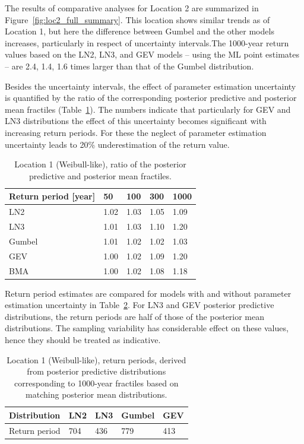 The results of comparative analyses for Location 2 are summarized in Figure~\ref{fig:loc2_full_summary}. This location shows similar trends as of Location 1, but here the difference between Gumbel and the other models increases, particularly in respect of uncertainty intervals.The 1000-year return values based on the LN2, LN3, and GEV models -- using the ML point estimates -- are 2.4, 1.4, 1.6 times larger than that of the Gumbel distribution. %

Besides the uncertainty intervals, the effect of parameter estimation uncertainty is quantified by the ratio of the corresponding posterior predictive and posterior mean fractiles (Table~\ref{tab:loc1_fract_ratio}). The numbers indicate that particularly for GEV and LN3 distributions the effect of this uncertainty becomes significant with increasing return periods. For these the neglect of parameter estimation uncertainty leads to 20\% underestimation of the return value.

\begin{table}[htbp!]
\caption{Location 1 (Weibull-like), ratio of the posterior predictive and posterior mean fractiles.}
\centering
\label{tab:loc1_fract_ratio}
\small
    \begin{tabular}{lllll}
    \toprule
    Return period [year]  & 50 & 100 & 300 & 1000 \\
    \midrule
    \rowcolor{lightgrey} LN2 & 1.02 & 1.03 & 1.05 &	1.09  \\
    LN3	& 1.01 & 1.03 &	1.10 & 1.20  \\
    \rowcolor{lightgrey} Gumbel & 1.01 & 1.02 &	1.02 & 1.03  \\
    GEV & 1.00 & 1.02 &	1.09 &	1.20  \\
   	\rowcolor{lightgrey} BMA & 1.00 & 1.02 &	1.08 & 1.18 \\
    \bottomrule
    \end{tabular}
\end{table}

Return period estimates are compared for models with and without parameter estimation uncertainty in Table~\ref{tab:loc1_reper}. For LN3 and GEV posterior predictive distributions, the return periods are half of those of the posterior mean distributions. The sampling variability has considerable effect on these values, hence they should be treated as indicative.

\begin{table}[htbp!]
\caption{Location 1 (Weibull-like), return periods, derived from posterior predictive distributions corresponding to 1000-year fractiles based on matching posterior mean distributions.}
\centering
\label{tab:loc1_reper}
\small
    \begin{tabular}{lllll}
    \toprule
    Distribution  & LN2 & LN3 & Gumbel & GEV \\
    \midrule
    \rowcolor{lightgrey} Return period & 704 & 436 & 779 &	413  \\
    \bottomrule
    \end{tabular}
\end{table}

